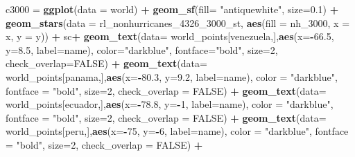 \documentclass[12pt,twoside]{reedthesis}
\newenvironment{Shaded}{\begin{snugshade}}{\end{snugshade}}
\newcommand{\DataTypeTok}[1]{\textcolor[rgb]{0.13,0.29,0.53}{#1}}
\newcommand{\DecValTok}[1]{\textcolor[rgb]{0.00,0.00,0.81}{#1}}
\newcommand{\FloatTok}[1]{\textcolor[rgb]{0.00,0.00,0.81}{#1}}
\newcommand{\KeywordTok}[1]{\textcolor[rgb]{0.13,0.29,0.53}{\textbf{#1}}}
\newcommand{\NormalTok}[1]{#1}
\newcommand{\OperatorTok}[1]{\textcolor[rgb]{0.81,0.36,0.00}{\textbf{#1}}}
\newcommand{\OtherTok}[1]{\textcolor[rgb]{0.56,0.35,0.01}{#1}}
\newcommand{\StringTok}[1]{\textcolor[rgb]{0.31,0.60,0.02}{#1}}
\begin{document}
\begin{Shaded}
\begin{Highlighting}[]
\NormalTok{c3000 =}\StringTok{ }\KeywordTok{ggplot}\NormalTok{(}\DataTypeTok{data =}\NormalTok{ world) }\OperatorTok{+}\StringTok{ }
\StringTok{  }\KeywordTok{geom_sf}\NormalTok{(}\DataTypeTok{fill=} \StringTok{"antiquewhite"}\NormalTok{, }\DataTypeTok{size=}\FloatTok{0.1}\NormalTok{) }\OperatorTok{+}\StringTok{ }
\StringTok{  }\KeywordTok{geom_stars}\NormalTok{(}\DataTypeTok{data =}\NormalTok{ rl_nonhurricanes_}\DecValTok{4326}\NormalTok{_}\DecValTok{3000}\NormalTok{_st, }\KeywordTok{aes}\NormalTok{(}\DataTypeTok{fill =}\NormalTok{ nh_}\DecValTok{3000}\NormalTok{, }\DataTypeTok{x =}\NormalTok{ x, }\DataTypeTok{y =}\NormalTok{ y)) }\OperatorTok{+}\StringTok{ }
\StringTok{  }\NormalTok{sc}\OperatorTok{+}
\StringTok{  }\KeywordTok{geom_text}\NormalTok{(}\DataTypeTok{data=}\NormalTok{ world_points[venezuela,],}\KeywordTok{aes}\NormalTok{(}\DataTypeTok{x=}\OperatorTok{-}\FloatTok{66.5}\NormalTok{, }\DataTypeTok{y=}\FloatTok{8.5}\NormalTok{, }\DataTypeTok{label=}\NormalTok{name), }\DataTypeTok{color=}\StringTok{"darkblue"}\NormalTok{, }\DataTypeTok{fontface=}\StringTok{"bold"}\NormalTok{, }\DataTypeTok{size=}\DecValTok{2}\NormalTok{, }\DataTypeTok{check_overlap=}\OtherTok{FALSE}\NormalTok{) }\OperatorTok{+}
\StringTok{  }\KeywordTok{geom_text}\NormalTok{(}\DataTypeTok{data=}\NormalTok{ world_points[panama,],}\KeywordTok{aes}\NormalTok{(}\DataTypeTok{x=}\OperatorTok{-}\FloatTok{80.3}\NormalTok{, }\DataTypeTok{y=}\FloatTok{9.2}\NormalTok{, }\DataTypeTok{label=}\NormalTok{name), }\DataTypeTok{color =} \StringTok{"darkblue"}\NormalTok{, }\DataTypeTok{fontface =} \StringTok{"bold"}\NormalTok{, }\DataTypeTok{size=}\DecValTok{2}\NormalTok{, }\DataTypeTok{check_overlap =} \OtherTok{FALSE}\NormalTok{) }\OperatorTok{+}\StringTok{ }
\StringTok{  }\KeywordTok{geom_text}\NormalTok{(}\DataTypeTok{data=}\NormalTok{ world_points[ecuador,],}\KeywordTok{aes}\NormalTok{(}\DataTypeTok{x=}\OperatorTok{-}\FloatTok{78.8}\NormalTok{, }\DataTypeTok{y=}\OperatorTok{-}\DecValTok{1}\NormalTok{, }\DataTypeTok{label=}\NormalTok{name), }\DataTypeTok{color =} \StringTok{"darkblue"}\NormalTok{, }\DataTypeTok{fontface =} \StringTok{"bold"}\NormalTok{, }\DataTypeTok{size=}\DecValTok{2}\NormalTok{, }\DataTypeTok{check_overlap =} \OtherTok{FALSE}\NormalTok{) }\OperatorTok{+}
\StringTok{  }\KeywordTok{geom_text}\NormalTok{(}\DataTypeTok{data=}\NormalTok{ world_points[peru,],}\KeywordTok{aes}\NormalTok{(}\DataTypeTok{x=}\OperatorTok{-}\DecValTok{75}\NormalTok{, }\DataTypeTok{y=}\OperatorTok{-}\DecValTok{6}\NormalTok{, }\DataTypeTok{label=}\NormalTok{name), }\DataTypeTok{color =} \StringTok{"darkblue"}\NormalTok{, }\DataTypeTok{fontface =} \StringTok{"bold"}\NormalTok{, }\DataTypeTok{size=}\DecValTok{2}\NormalTok{, }\DataTypeTok{check_overlap =} \OtherTok{FALSE}\NormalTok{) }\OperatorTok{+}

\end{Highlighting}
\end{Shaded}
\end{document}
